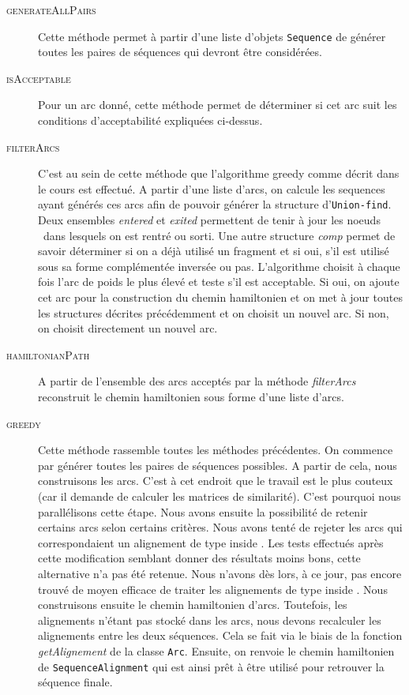 \begin{description}
	\item[\textsc{generateAllPairs}] Cette méthode permet à partir d'une liste d'objets \verb|Sequence| de générer toutes les paires de séquences qui devront être considérées.
	\item[\textsc{isAcceptable}] Pour un arc donné, cette méthode permet de déterminer si cet arc suit les conditions d'acceptabilité expliquées ci-dessus. 
	\item[\textsc{filterArcs}] C'est au sein de cette méthode que l'algorithme greedy comme décrit dans le cours est effectué. A partir d'une liste d'arcs, on calcule les sequences ayant générés ces arcs afin de pouvoir générer la structure d'\verb|Union-find|. Deux ensembles \emph{entered} et \emph{exited} permettent de tenir à jour les \og noeuds \fg~dans lesquels on est rentré ou sorti. Une autre structure \emph{comp} permet de savoir déterminer si on a déjà utilisé un fragment et si oui, s'il est utilisé sous sa forme complémentée inversée ou pas. L'algorithme choisit à chaque fois l'arc de poids le plus élevé et teste s'il est acceptable. Si oui, on ajoute cet arc pour la construction du chemin hamiltonien et on met à jour toutes les structures décrites précédemment et on choisit un nouvel arc. Si non, on choisit directement un nouvel arc.
	\item[\textsc{hamiltonianPath}] A partir de l'ensemble des arcs acceptés par la méthode \emph{filterArcs} reconstruit le chemin hamiltonien sous forme d'une liste d'arcs.
	\item[\textsc{greedy}] Cette méthode rassemble toutes les méthodes précédentes. On commence par générer toutes les paires de séquences possibles. A partir de cela, nous construisons les arcs. C'est à cet endroit que le travail est le plus couteux (car il demande de calculer les matrices de similarité). C'est pourquoi nous parallélisons cette étape. Nous avons ensuite la possibilité de retenir certains arcs selon certains critères. Nous avons tenté de rejeter les arcs qui correspondaient un alignement de type \og inside \fg. Les tests effectués après cette modification semblant donner des résultats moins bons, cette alternative n'a pas été retenue. Nous n'avons dès lors, à ce jour, pas encore trouvé de moyen efficace de traiter les alignements de type \og inside \fg. Nous construisons ensuite le chemin hamiltonien d'arcs. Toutefois, les alignements n'étant pas stocké dans les arcs, nous devons recalculer les alignements entre les deux séquences. Cela se fait via le biais de la fonction \emph{getAlignement} de la classe \verb|Arc|. 
	Ensuite, on renvoie le chemin hamiltonien de \verb|SequenceAlignment| qui est ainsi prêt à être utilisé pour retrouver la séquence finale.	
\end{description}



